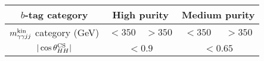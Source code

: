 \begin{tabular}{ |c ||  c | c | c | c |}
\hline
$b$-tag category & \multicolumn{2}{c|}{High purity} & \multicolumn{2}{c|}{Medium purity} \\\hline
$m_{\gamma\gamma jj}^{\rm kin}$ category (GeV) & $< 350$ & $> 350$ & $< 350$ & $> 350$  \\ \hline
$|\cos {\theta^{\rm CS}_{HH}}|$ &  \multicolumn{2}{c|}{$< 0.9$} & \multicolumn{2}{c|}{$< 0.65$} \\\hline
\end{tabular}
